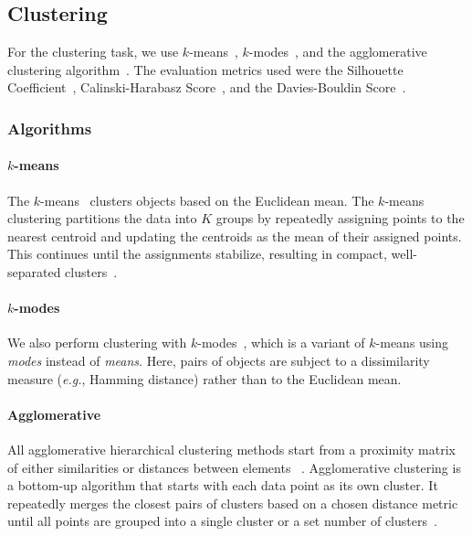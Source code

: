 \documentclass[]{Liebert_Author_revised}
\newcommand{\eg}{\emph{e.g.}}
\begin{document}
\subsection{Clustering}
For the clustering task, we use $k$-means~\citeauthor{kmeans}, $k$-modes~\citeauthor{huang-1998-extensions}, and the agglomerative clustering algorithm~\citeauthor{ward1963hierarchical}. The evaluation metrics used were the Silhouette Coefficient~\citeauthor{rousseeuw1987silhouettes}, Calinski-Harabasz Score~\citeauthor{calinski1974dendrite}, and the Davies-Bouldin Score~\citeauthor{davies1979cluster}.

\subsubsection{Algorithms}

\paragraph{$k$-means~\citeauthor{kmeans}}
The $k$-means~\citeauthor{kmeans} clusters
objects based on the Euclidean mean. The $k$-means clustering partitions the data into $K$ groups by repeatedly assigning points to the nearest centroid and updating the centroids as the mean of their assigned points. This continues until the assignments stabilize, resulting in compact, well-separated clusters~\citeauthor{kanungo2002efficient}.

\paragraph{$k$-modes~\citeauthor{huang-1998-extensions}}
We also perform clustering with $k$-modes~\citeauthor{huang-1998-extensions}, which is a variant of $k$-means
using \textit{modes} instead of \textit{means}.  Here, pairs of
objects are subject to a dissimilarity measure (\eg, Hamming distance) rather than to the Euclidean mean.

\paragraph{Agglomerative~\citeauthor{ward1963hierarchical}}
All agglomerative hierarchical clustering methods start from a proximity matrix of either similarities or distances between elements ~\citeauthor{nei1978estimation}. Agglomerative clustering is a bottom-up algorithm that starts with each data point as its own cluster. It repeatedly merges the closest pairs of clusters based on a chosen distance metric until all points are grouped into a single cluster or a set number of clusters~\citeauthor{mojena1977hierarchical}. 
\end{document}
